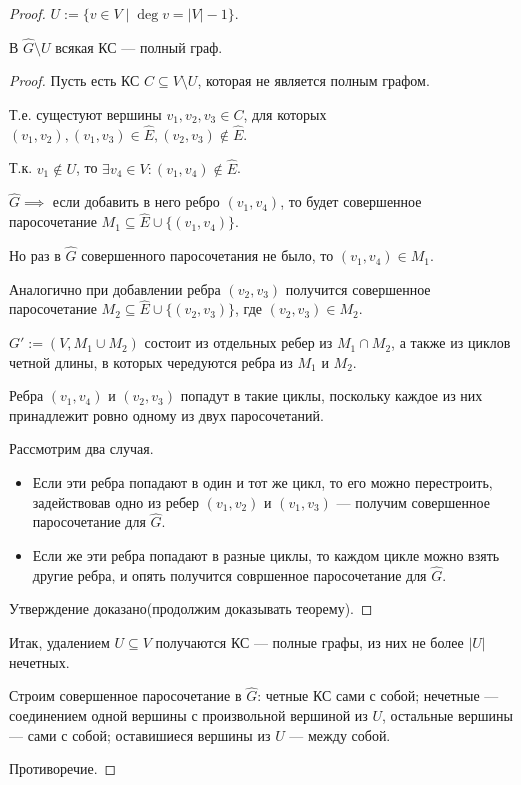 \begin{normalsize}
\begin{proof}
    $U := \{v \in V \mid \deg v = |V| - 1\}$.
    
    \begin{theorem-non}
        В $\hat{G} \setminus U$ всякая КС --- полный граф.
    \end{theorem-non}
    
    \begin{proof}
        
        Пусть есть КС $C \subseteq V \setminus U$, которая не является полным графом.
        
        Т.е. сущестуют вершины $v_1, v_2, v_3 \in C$, для которых $(v_1, v_2), (v_1, v_3) \in \hat{E}, (v_2, v_3) \notin \hat{E}$.
        
        Т.к. $v_1 \notin U$, то $\exists v_4 \in V: (v_1, v_4) \notin \hat{E}$.
        
        $\hat{G} \implies$ если добавить в него ребро $(v_1, v_4)$, то будет совершенное паросочетание $M_1 \subseteq \hat{E} \cup \{(v_1, v_4)\}$.
        
        Но раз в $\hat{G}$ совершенного паросочетания не было, то $(v_1, v_4) \in M_1$.
        
        Аналогично при добавлении ребра $(v_2, v_3)$ получится совершенное паросочетание $M_2 \subseteq \hat{E} \cup \{(v_2, v_3)\}$, где $(v_2, v_3) \in M_2$.
        
        $G' := (V, M_1 \cup M_2)$ состоит из отдельных ребер из $M_1 \cap M_2$, а также из циклов четной длины, в которых чередуются ребра из $M_1$ и $M_2$.
        
        Ребра $(v_1, v_4)$ и $(v_2, v_3)$ попадут в такие циклы, поскольку каждое из них принадлежит ровно одному из двух паросочетаний.
        
        Рассмотрим два случая.
        
        \begin{itemize}
            \item Если эти ребра попадают в один и тот же цикл, то его можно перестроить, задействовав одно из ребер $(v_1, v_2)$ и $(v_1, v_3)$ --- получим совершенное паросочетание для $\hat{G}$.
        
            \item Если же эти ребра попадают в разные циклы, то каждом цикле можно взять другие ребра, и опять получится совршенное паросочетание для $\hat{G}$.
        \end{itemize}
        
        Утверждение доказано(продолжим доказывать теорему).
    \end{proof}
    
    Итак, удалением $U \subseteq V$ получаются КС --- полные графы, из них не более $|U|$ нечетных.
    
    Строим совершенное паросочетание в $\hat{G}$: четные КС сами с собой; нечетные --- соединением одной вершины с произвольной вершиной из $U$, остальные вершины --- сами с собой; оставишиеся вершины из $U$ --- между собой.
    
    Противоречие.
\end{proof}

\end{normalsize}